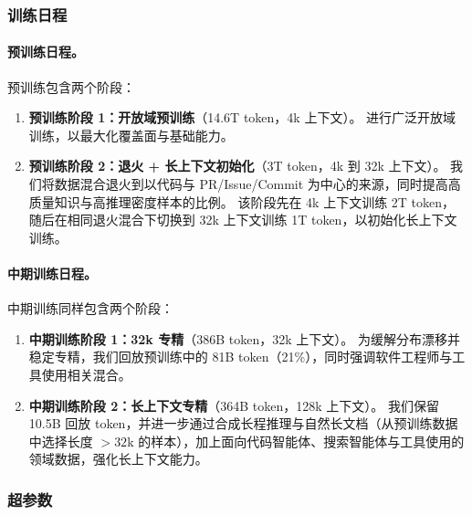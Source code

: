 \subsubsection{训练日程}
\label{sec:schedule}

\paragraph{预训练日程。}
预训练包含两个阶段：
\begin{enumerate}[leftmargin=*,nosep]
    \item \textbf{预训练阶段 1：开放域预训练}（{14.6T} token，{4k} 上下文）。
    进行广泛开放域训练，以最大化覆盖面与基础能力。

    \item \textbf{预训练阶段 2：退火 + 长上下文初始化}（{3T} token，{4k 到 32k} 上下文）。
    我们将数据混合退火到以代码与 PR/Issue/Commit 为中心的来源，同时提高高质量知识与高推理密度样本的比例。
    该阶段先在 4k 上下文训练 {2T} token，随后在相同退火混合下切换到 32k 上下文训练 {1T} token，以初始化长上下文训练。

\end{enumerate}

\paragraph{中期训练日程。}
中期训练同样包含两个阶段：
\begin{enumerate}[leftmargin=*,nosep]
    \item \textbf{中期训练阶段 1：32k 专精}（{386B} token，{32k} 上下文）。
    为缓解分布漂移并稳定专精，我们回放预训练中的 {81B} token（21\%），同时强调软件工程师与工具使用相关混合。

    \item \textbf{中期训练阶段 2：长上下文专精}（{364B} token，{128k} 上下文）。
    我们保留 {10.5B} 回放 token，并进一步通过合成长程推理与自然长文档（从预训练数据中选择长度 $>32$k 的样本），加上面向代码智能体、搜索智能体与工具使用的领域数据，强化长上下文能力。
\end{enumerate}


\subsubsection{超参数}
\label{sec:hyperparams}

